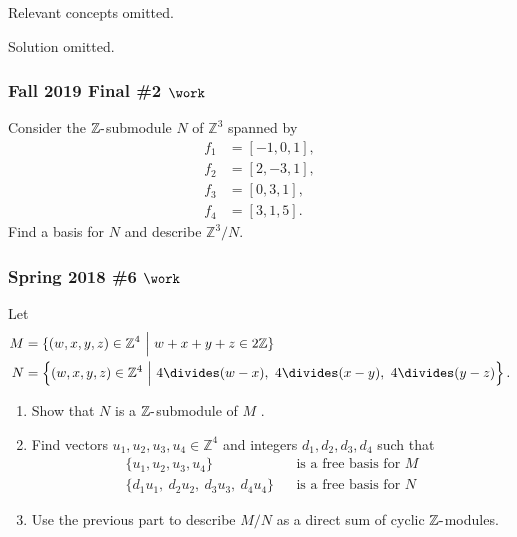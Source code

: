 Relevant concepts omitted.

Solution omitted.

\hypertarget{fall-2019-final-2-work}{%
\subsubsection{\texorpdfstring{Fall 2019 Final \#2
\(\work\)}{Fall 2019 Final \#2 \textbackslash work}}\label{fall-2019-final-2-work}}

Consider the \({\mathbb{Z}}{\hbox{-}}\)submodule \(N\) of
\({\mathbb{Z}}^3\) spanned by
\begin{align*}
f_1 &= [-1, 0, 1], \\
f_2 &= [2,-3,1], \\
f_3 &= [0, 3, 1], \\
f_4 &= [3,1,5]
.\end{align*}
Find a basis for \(N\) and describe \({\mathbb{Z}}^3/N\).

\hypertarget{spring-2018-6-work}{%
\subsubsection{\texorpdfstring{Spring 2018 \#6
\(\work\)}{Spring 2018 \#6 \textbackslash work}}\label{spring-2018-6-work}}

Let
\begin{align*}
M &= \{(w, x, y, z) \in {\mathbb{Z}}^4 {~\mathrel{\Big|}~}w + x + y + z \in 2{\mathbb{Z}}\} \\
N &= \left\{{
(w, x, y, z) \in {\mathbb{Z}}^4 {~\mathrel{\Big|}~}4\divides (w - x),~ 4\divides (x - y),~ 4\divides ( y - z)
}\right\}
.\end{align*}

\begin{enumerate}
\def\labelenumi{\alph{enumi}.}
\item
  Show that \(N\) is a \({\mathbb{Z}}{\hbox{-}}\)submodule of \(M\) .
\item
  Find vectors \(u_1 , u_2 , u_3 , u_4 \in {\mathbb{Z}}^4\) and integers
  \(d_1 , d_2 , d_3 , d_4\) such that
  \begin{align*}
  \{
  u_1 , u_2 , u_3 , u_4 
  \} 
  && \text{is a free basis for }M
  \\
  \{
  d_1 u_1,~ d_2 u_2,~ d_3 u_3,~ d_4 u_4 
  \}
  && \text{is a free basis for }N
  \end{align*}
\item
  Use the previous part to describe \(M/N\) as a direct sum of cyclic
  \({\mathbb{Z}}{\hbox{-}}\)modules.
\end{enumerate}

